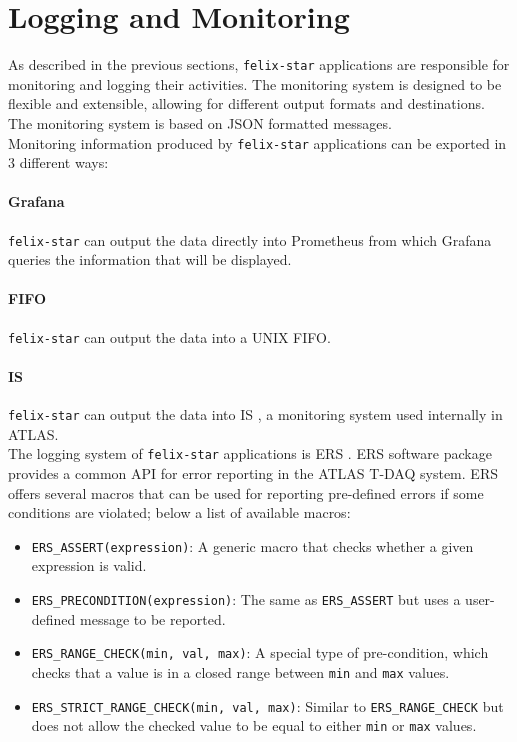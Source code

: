 \section{Logging and Monitoring}
\label{sec:felix_monitoring}

As described in the previous sections, \texttt{felix-star} applications are responsible for monitoring and logging their activities. The monitoring system is designed to be flexible and extensible, allowing for different output formats and destinations.\\
The monitoring system is based on JSON formatted messages.\\
Monitoring information produced by \texttt{felix-star} applications can be exported in 3 different ways:

\paragraph{Grafana} \texttt{felix-star} can output the data directly into Prometheus \cite{prometheus} from which Grafana \cite{grafana} queries the information that will be displayed.

\paragraph{FIFO} \texttt{felix-star} can output the data into a UNIX FIFO.

\paragraph{\ac{IS}} \texttt{felix-star} can output the data into \acs{IS} \cite{is}, a monitoring system used internally in \acs{ATLAS}.\\

The logging system of \texttt{felix-star} applications is \acf{ERS} \cite{ers}. \acs{ERS} software package provides a common \acs{API} for error reporting in the \acs{ATLAS} \acs{T-DAQ} system. \acs{ERS} offers several macros that can be used for reporting pre-defined errors if some conditions are violated; below a list of available macros:

\begin{itemize}
    \item \texttt{ERS\_ASSERT(expression)}: A generic macro that checks whether a given expression is valid.
    \item \texttt{ERS\_PRECONDITION(expression)}: The same as \texttt{ERS\_ASSERT} but uses a user-defined message to be reported.
    \item \texttt{ERS\_RANGE\_CHECK(min, val, max)}: A special type of pre-condition, which checks that a value is in a closed range between \texttt{min} and \texttt{max} values.
    \item \texttt{ERS\_STRICT\_RANGE\_CHECK(min, val, max)}: Similar to \texttt{ERS\_RANGE\_CHECK} but does not allow the checked value to be equal to either \texttt{min} or \texttt{max} values.
\end{itemize}

